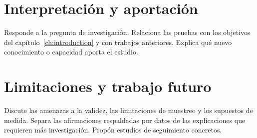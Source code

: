 \section{Interpretación y aportación}
Responde a la pregunta de investigación. Relaciona las pruebas con los objetivos
del capítulo~\ref{ch:introduction} y con trabajos anteriores. Explica qué nuevo
conocimiento o capacidad aporta el estudio.
\section{Limitaciones y trabajo futuro}
Discute las amenazas a la validez, las limitaciones de muestreo y los supuestos
de medida. Separa las afirmaciones respaldadas por datos de las explicaciones
que requieren más investigación. Propón estudios de seguimiento concretos.
